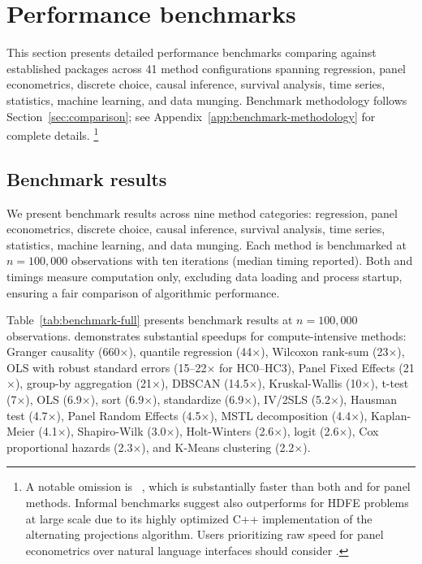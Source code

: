 
\section{Performance benchmarks} \label{sec:performance}

This section presents detailed performance benchmarks comparing
 against established  packages across
41 method configurations spanning regression, panel econometrics, discrete
choice, causal inference, survival analysis, time series, statistics,
machine learning, and data munging.
Benchmark methodology follows
Section~\ref{sec:comparison}; see Appendix~\ref{app:benchmark-methodology}
for complete details.%
\footnote{A notable omission is ~\citep{Berge:2018}, which is
substantially faster than both  and  for panel methods.
Informal benchmarks suggest  also outperforms 
for HDFE problems at large scale due to its highly optimized C++ implementation
of the alternating projections algorithm. Users prioritizing raw speed for
panel econometrics over natural language interfaces should consider .}

\subsection{Benchmark results} \label{sec:benchmark-results}

We present benchmark results across nine method categories: regression,
panel econometrics, discrete choice, causal inference, survival analysis,
time series, statistics, machine learning, and data munging.
Each method is benchmarked at $n = 100{,}000$ observations with ten
iterations (median timing reported). Both  and 
timings measure computation only, excluding data loading and process
startup, ensuring a fair comparison of algorithmic performance.

Table~\ref{tab:benchmark-full} presents benchmark results at $n = 100{,}000$
observations.
 demonstrates substantial speedups for compute-intensive
methods: Granger causality (660$\times$), quantile regression (44$\times$),
Wilcoxon rank-sum (23$\times$), OLS with robust standard errors
(15--22$\times$ for HC0--HC3), Panel Fixed Effects (21$\times$),
group-by aggregation (21$\times$), DBSCAN (14.5$\times$),
Kruskal-Wallis (10$\times$), t-test (7$\times$),
OLS (6.9$\times$), sort (6.9$\times$), standardize (6.9$\times$),
IV/2SLS (5.2$\times$), Hausman test (4.7$\times$),
Panel Random Effects (4.5$\times$), MSTL decomposition (4.4$\times$),
Kaplan-Meier (4.1$\times$), Shapiro-Wilk (3.0$\times$),
Holt-Winters (2.6$\times$), logit (2.6$\times$), Cox proportional hazards
(2.3$\times$), and K-Means clustering (2.2$\times$).


